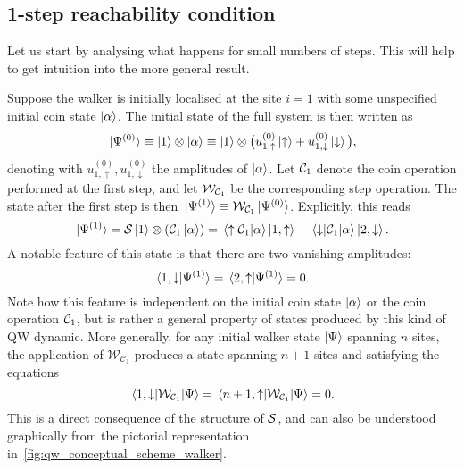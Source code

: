\subsection{1-step reachability condition}
\label{sec:1step_reachability}

Let us start by analysing what happens for small numbers of steps. This will help to get intuition into the more general result.

Suppose the walker is initially localised at the site $i=1$ with some unspecified initial coin state $\ket\alpha$.
The initial state of the full system is then written as
\begin{equation}
    \ket*{\Psi^{(0)}} \equiv
    \ket1\otimes\ket\alpha \equiv
    \ket{1}\otimes \big(u^{(0)}_{1,\uparrow} \ket{\uparrow} +
    u^{(0)}_{1,\downarrow} \ket{\downarrow} \big),
\end{equation}
denoting with $u^{(0)}_{1,\uparrow},u^{(0)}_{1,\downarrow}$ the amplitudes of $\ket\alpha$.
Let ${\mathcal{C}}_1$ denote the coin operation performed at the first step,
and let ${\mathcal{W}}_{{\mathcal{C}}_1}$ be the corresponding step operation.
The state after the first step is then
$\ket*{\Psi^{(1)}} \equiv {\mathcal{W}}_{{\mathcal{C}}_1} \ket*{\Psi^{(0)}}$.
Explicitly, this reads
\begin{equation}
    \ket*{\Psi^{(1)}} =
    {\mathcal{S}} \ket1\otimes({\mathcal{C}}_1\ket\alpha) =
    \mel{\uparrow}{{\mathcal{C}}_1}{\alpha} \ket{1,\uparrow} +
    \mel{\downarrow}{{\mathcal{C}}_1}{\alpha} \ket{2,\downarrow}.
\end{equation}
A notable feature of this state is that there are two vanishing amplitudes:
\begin{equation}
    \braket*{1, \downarrow}{\Psi^{(1)}} = \braket*{2, \uparrow}{\Psi^{(1)}} = 0.
\end{equation}
Note how this feature is independent on the initial coin state $\ket\alpha$ or the coin operation ${\mathcal{C}}_1$, but is rather a general property of states produced by this kind of \ac{QW} dynamic.
More generally, for any initial walker state $\ket{\Psi}$ spanning $n$ sites, the application of $\mathcal W_{\mathcal C_1}$ produces a state spanning $n+1$ sites and satisfying the equations
\begin{equation}
	\mel{1, \downarrow}{\mathcal W_{\mathcal C_1}}{\Psi} =
	\mel{n+1, \uparrow}{\mathcal W_{\mathcal C_1}}{\Psi} = 0.
	\label{eq:vanishing_endpoints}
\end{equation}
This is a direct consequence of the structure of ${\mathcal{S}}$, and can also be understood graphically from the pictorial representation in~\cref{fig:qw_conceptual_scheme_walker}.
